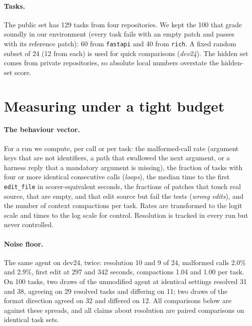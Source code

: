 \documentclass[11pt]{article}
\begin{document}
\paragraph{Tasks.} The public set has 129 tasks from four repositories. We kept the 100 that grade soundly in our environment (every task fails with an empty patch and passes with its reference patch): 60 from \texttt{fastapi} and 40 from \texttt{rich}. A fixed random subset of 24 (12 from each) is used for quick comparisons (\emph{dev24}). The hidden set comes from private repositories, so absolute local numbers overstate the hidden-set score.

\section{Measuring under a tight budget}\label{sec:measure}

\paragraph{The behaviour vector.} For a run we compute, per call or per task: the malformed-call rate (argument keys that are not identifiers, a path that swallowed the next argument, or a harness reply that a mandatory argument is missing), the fraction of tasks with four or more identical consecutive calls (\emph{loops}), the median time to the first \texttt{edit\_file} in scorer-equivalent seconds, the fractions of patches that touch real source, that are empty, and that edit source but fail the tests (\emph{wrong edits}), and the number of context compactions per task. Rates are transformed to the logit scale and times to the log scale for control. Resolution is tracked in every run but never controlled.

\paragraph{Noise floor.} The same agent on dev24, twice: resolution 10 and 9 of 24, malformed calls 2.0\% and 2.9\%, first edit at 297 and 342 seconds, compactions 1.04 and 1.00 per task. On 100 tasks, two draws of the unmodified agent at identical settings resolved 31 and 38, agreeing on 29 resolved tasks and differing on 11; two draws of the format direction agreed on 32 and differed on 12. All comparisons below are against these spreads, and all claims about resolution are paired comparisons on identical task sets.
\end{document}
